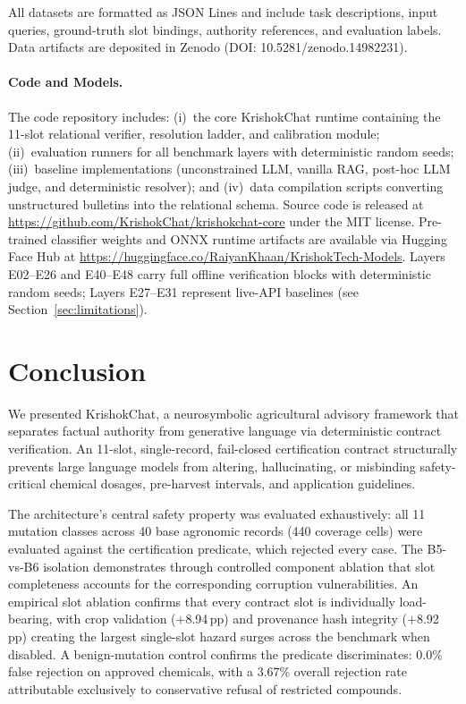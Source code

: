 \documentclass[a4paper,fleqn]{cas-dc}
\begin{document}
All datasets are formatted as JSON Lines and include task descriptions, input queries, ground-truth slot bindings, authority references, and evaluation labels. Data artifacts are deposited in Zenodo (DOI: 10.5281/zenodo.14982231).

\paragraph{Code and Models.}
The code repository includes: (i)~the core KrishokChat runtime containing the 11-slot relational verifier, resolution ladder, and calibration module; (ii)~evaluation runners for all benchmark layers with deterministic random seeds; (iii)~baseline implementations (unconstrained LLM, vanilla RAG, post-hoc LLM judge, and deterministic resolver); and (iv)~data compilation scripts converting unstructured bulletins into the relational schema. Source code is released at \url{https://github.com/KrishokChat/krishokchat-core} under the MIT license. Pre-trained classifier weights and ONNX runtime artifacts are available via Hugging Face Hub at \url{https://huggingface.co/RaiyanKhaan/KrishokTech-Models}. Layers E02--E26 and E40--E48 carry full offline verification blocks with deterministic random seeds; Layers E27--E31 represent live-API baselines (see Section~\ref{sec:limitations}).


\section{Conclusion}
\label{sec:conclusion}

We presented KrishokChat, a neurosymbolic agricultural advisory framework that separates factual authority from generative language via deterministic contract verification. An 11-slot, single-record, fail-closed certification contract structurally prevents large language models from altering, hallucinating, or misbinding safety-critical chemical dosages, pre-harvest intervals, and application guidelines.

The architecture's central safety property was evaluated exhaustively: all 11 mutation classes across 40 base agronomic records (440 coverage cells) were evaluated against the certification predicate, which rejected every case. The B5-vs-B6 isolation demonstrates through controlled component ablation that slot completeness accounts for the corresponding corruption vulnerabilities. An empirical slot ablation confirms that every contract slot is individually load-bearing, with crop validation ($+$8.94\,pp) and provenance hash integrity ($+$8.92\,pp) creating the largest single-slot hazard surges across the benchmark when disabled. A benign-mutation control confirms the predicate discriminates: 0.0\% false rejection on approved chemicals, with a 3.67\% overall rejection rate attributable exclusively to conservative refusal of restricted compounds.
\end{document}
